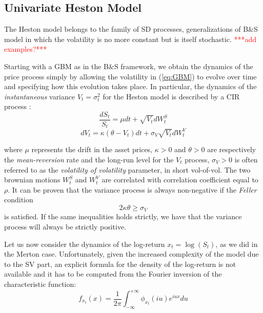 \subsection{Univariate Heston Model}
The Heston model belongs to the family of SD processes, generalizations of B\&S model in which the volatility is no more constant but is itself  stochastic.
\textcolor{red}{***add examples?***}

Starting with a GBM as in the B\&S framework, we obtain the dynamics of the price process simply by allowing the volatility in (\ref{eq:GBM}) to evolve over time and specifying how this evolution takes place.
In particular, the dynamics of the \textit{instantaneous} variance $V_t = \sigma_t^2$ for the Heston model is described by a CIR process :
\begin{equation}
\label{eq:heston_price}
	\frac{dS_t}{S_t} = \mu dt +\sqrt{ V_t} dW_t^S
\end{equation}
\begin{equation}
\label{eq:heston_variance}
	dV_t = \kappa (\theta - V_t) dt + \sigma_V \sqrt{V_t} dW_t^V
\end{equation}

where $\mu$ represents the drift in the asset prices, $\kappa>0$ and $\theta>0$ are respectively the \textit{mean-reversion} rate  and the long-run level for the $V_t$ process, $\sigma_V>0$ is often referred to as the \textit{volatility of volatility} parameter, in short vol-of-vol.
The two brownian motions $W_t^S$ and $W_t^V$ are correlated with correlation coefficient equal to $\rho$.
It can be proven that the variance process is always non-negative if the \textit{Feller} condition
 \begin{equation}
 \label{eq:feller_condition}
	2\kappa\theta \geq \sigma_V
 \end{equation} 
 is satisfied. If the same inequalities holds strictly, we have that the variance process will always be strictly positive.

Let us now consider the dynamics of the log-return $x_t = \log (S_t)$, as we did in the Merton case. 
Unfortunately, given the increased complexity of the model due to the SV part, an explicit formula for the density of the log-return is not available and it has to be computed from the Fourier inversion of the characteristic function:
\begin{equation}
\label{eq:chf_inversion}
f_{x_t}(x) = \frac{1}{2\pi}\int_{-\infty}^{+\infty} \phi_{x_t}(i u) e^{i u x} du
\end{equation}

